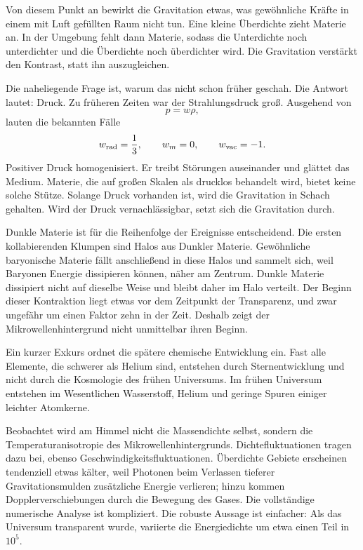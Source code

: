 Von diesem Punkt an bewirkt die Gravitation etwas, was gewöhnliche Kräfte in einem mit Luft gefüllten Raum nicht tun. Eine kleine Überdichte zieht Materie an. In der Umgebung fehlt dann Materie, sodass die Unterdichte noch unterdichter und die Überdichte noch überdichter wird. Die Gravitation verstärkt den Kontrast, statt ihn auszugleichen.

Die naheliegende Frage ist, warum das nicht schon früher geschah. Die Antwort lautet: Druck. Zu früheren Zeiten war der Strahlungsdruck groß. Ausgehend von
\begin{equation}
p=w\rho,
\end{equation}
lauten die bekannten Fälle
\begin{equation}
w_{\rm rad}=\frac13,\qquad
w_m=0,\qquad
w_{\rm vac}=-1.
\end{equation}
Positiver Druck homogenisiert. Er treibt Störungen auseinander und glättet das Medium. Materie, die auf großen Skalen als drucklos behandelt wird, bietet keine solche Stütze. Solange Druck vorhanden ist, wird die Gravitation in Schach gehalten. Wird der Druck vernachlässigbar, setzt sich die Gravitation durch.

Dunkle Materie ist für die Reihenfolge der Ereignisse entscheidend. Die ersten kollabierenden Klumpen sind Halos aus Dunkler Materie. Gewöhnliche baryonische Materie fällt anschließend in diese Halos und sammelt sich, weil Baryonen Energie dissipieren können, näher am Zentrum. Dunkle Materie dissipiert nicht auf dieselbe Weise und bleibt daher im Halo verteilt. Der Beginn dieser Kontraktion liegt etwas vor dem Zeitpunkt der Transparenz, und zwar ungefähr um einen Faktor zehn in der Zeit. Deshalb zeigt der Mikrowellenhintergrund nicht unmittelbar ihren Beginn.

Ein kurzer Exkurs ordnet die spätere chemische Entwicklung ein. Fast alle Elemente, die schwerer als Helium sind, entstehen durch Sternentwicklung und nicht durch die Kosmologie des frühen Universums. Im frühen Universum entstehen im Wesentlichen Wasserstoff, Helium und geringe Spuren einiger leichter Atomkerne.

Beobachtet wird am Himmel nicht die Massendichte selbst, sondern die Temperaturanisotropie des Mikrowellenhintergrunds. Dichtefluktuationen tragen dazu bei, ebenso Geschwindigkeitsfluktuationen. Überdichte Gebiete erscheinen tendenziell etwas kälter, weil Photonen beim Verlassen tieferer Gravitationsmulden zusätzliche Energie verlieren; hinzu kommen Dopplerverschiebungen durch die Bewegung des Gases. Die vollständige numerische Analyse ist kompliziert. Die robuste Aussage ist einfacher: Als das Universum transparent wurde, variierte die Energiedichte um etwa einen Teil in \(10^5\).

